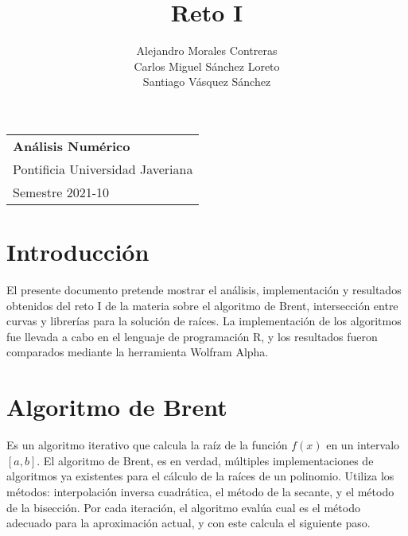 \documentclass[a4paper,12pt]{article}
\begin{document}
\thispagestyle{empty}

\begin{tabular}{p{14cm}}
{\large \bf Análisis Numérico} \\
Pontificia Universidad Javeriana \\ Semestre 2021-10 \\
\hline
\end{tabular}

\title{Reto I}
\author{Alejandro Morales Contreras \\ Carlos Miguel Sánchez Loreto \\ Santiago Vásquez Sánchez}
\date{}

\begingroup
\let\newpage\relax
\maketitle
\endgroup


\section{Introducción}


El presente documento pretende mostrar el análisis, implementación y resultados obtenidos del reto I de la materia sobre el algoritmo de Brent, intersección entre curvas y librerías para la solución de raíces. La implementación de los algoritmos fue llevada a cabo en el lenguaje de programación R, y los resultados fueron comparados mediante la herramienta Wolfram Alpha.


\section{Algoritmo de Brent}

Es un algoritmo iterativo que calcula la raíz de la función $f(x)$ en un intervalo $[a,b]$. El algoritmo de Brent, es en verdad, múltiples implementaciones de algoritmos ya existentes para el cálculo de la raíces de un polinomio. Utiliza los métodos: interpolación inversa cuadrática, el método de la secante, y el método de la bisección. Por cada iteración, el algoritmo evalúa cual es el método adecuado para la aproximación actual, y con este calcula el siguiente paso. \cite{fuente_oconnor_ingenierialgoritmos_2017} \par
\end{document}

